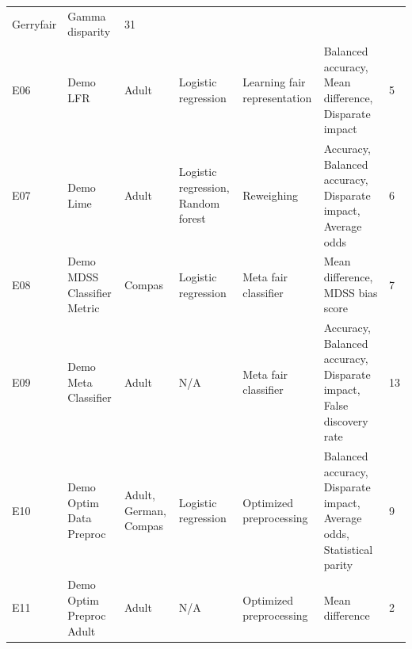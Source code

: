 \documentclass[sigconf,review]{acmart}
\begin{document}
\begin{table}[]
\begin{tabular}{ p{1em} L{10em} R{4em} R{8em} R{9em} R{12em} R{2.5em} }
		Gerryfair &
		Gamma disparity &
		31 \\
		E06 &
		Demo LFR &
		Adult &
		Logistic regression &
		Learning fair representation &
		Balanced accuracy, Mean difference, Disparate impact &
		5 \\
		E07 &
		Demo Lime &
		Adult &
		Logistic regression, Random forest &
		Reweighing &
		Accuracy, Balanced accuracy, Disparate impact, Average odds &
		6 \\
		E08 &
		Demo MDSS Classifier Metric &
		Compas &
		Logistic regression &
		Meta fair classifier &
		Mean difference, MDSS bias score &
		7 \\
		E09 &
		Demo Meta Classifier &
		Adult &
		N/A &
		Meta fair classifier &
		Accuracy, Balanced accuracy, Disparate impact, False discovery rate &
		13 \\
		E10 &
		Demo Optim Data Preproc &
		Adult, German, Compas &
		Logistic regression &
		Optimized preprocessing &
		Balanced accuracy, Disparate impact, Average odds, Statistical parity &
		9 \\
		E11 &
		Demo Optim Preproc Adult &
		Adult &
		N/A &
		Optimized preprocessing &
		Mean difference &
		2 \\
	 	\hline
	\end{tabular}
\end{table}
\end{document}
